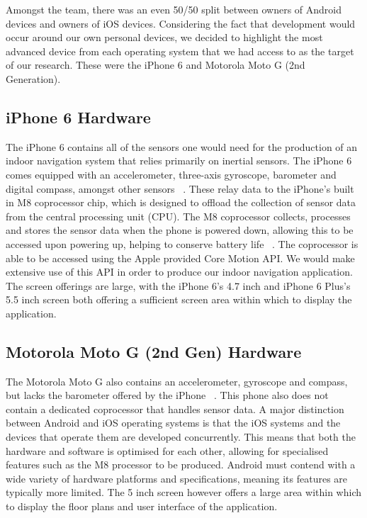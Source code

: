 \documentclass[main.tex]{subfiles}
\begin{document}
Amongst the team, there was an even 50/50 split between owners of Android devices and owners of iOS devices. Considering the fact that development would occur around our own personal devices, we decided to highlight the most advanced device from each operating system that we had access to as the target of our research. These were the iPhone 6 and Motorola Moto G (2nd Generation).

\subsection{iPhone 6 Hardware}

The iPhone 6 contains all of the sensors one would need for the production of an indoor navigation system that relies primarily on inertial sensors. The iPhone 6 comes equipped with an accelerometer, three-axis gyroscope, barometer and digital compass, amongst other sensors ~\cite{iosSpecs}. These relay data to the iPhone's built in M8 coprocessor chip, which is designed to offload the collection of sensor data from the central processing unit (CPU). The M8 coprocessor collects, processes and stores the sensor data when the phone is powered down, allowing this to be accessed upon powering up, helping to conserve battery life ~\cite{m8}. The coprocessor is able to be accessed using the Apple provided Core Motion API. We would make extensive use of this API in order to produce our indoor navigation application. The screen offerings are large, with the iPhone 6's 4.7 inch and iPhone 6 Plus's 5.5 inch screen both offering a sufficient screen area within which to display the application.

\subsection{Motorola Moto G (2nd Gen) Hardware}

The Motorola Moto G also contains an accelerometer, gyroscope and compass, but lacks the barometer offered by the iPhone ~\cite{motoSpecs}. This phone also does not contain a dedicated coprocessor that handles sensor data. A major distinction between Android and iOS operating systems is that the iOS systems and the devices that operate them are developed concurrently. This means that both the hardware and software is optimised for each other, allowing for specialised features such as the M8 processor to be produced. Android must contend with a wide variety of hardware platforms and specifications, meaning its features are typically more limited. The 5 inch screen however offers a large area within which to display the floor plans and user interface of the application.
\end{document}
